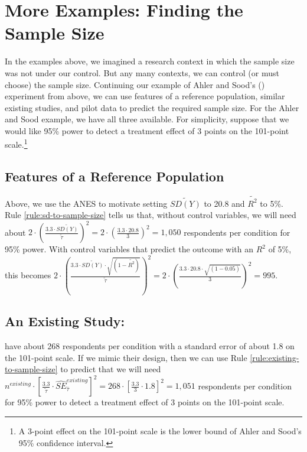 \documentclass[12pt]{article}
\begin{document}
\section*{More Examples: Finding the Sample Size}

In the examples above, we imagined a research context in which the sample size was not under our control. 
But any many contexts, we can control (or must choose) the sample size. 
Continuing our example of Ahler and Sood's (\citeyear{Ahler2018}) experiment from above, we can use features of a reference population, similar existing studies, and pilot data to predict the required sample size. 
For the Ahler and Sood example, we have all three available. 
For simplicity, suppose that we would like 95\% power to detect a treatment effect of 3 points on the 101-point scale.\footnote{A 3-point effect on the 101-point scale is the lower bound of Ahler and Sood's 95\% confidence interval.}

\subsection*{Features of a Reference Population}

Above, we use the ANES to motivate setting $\widetilde{SD(Y)}$ to 20.8 and $\widetilde{R^{2}}$ to 5\%. 
Rule \ref{rule:sd-to-sample-size} tells us that, without control variables, we will need about $2 \cdot \left( \frac{3.3 \cdot \widetilde{SD(Y)}}{\widetilde{\tau}} \right)^{2} = 2 \cdot \left( \frac{3.3 \cdot 20.8}{3} \right)^{2} = 1,050$ respondents per condition for 95\% power. 
With control variables that predict the outcome with an $R^2$ of 5\%, this becomes ${2 \cdot \left( \frac{3.3 \cdot \widetilde{SD(Y)} \cdot \sqrt{\left( 1 - \widetilde{R^{2}} \right)}}{\widetilde{\tau}} \right)}^{2} = 2 \cdot \left( \frac{3.3 \cdot 20.8 \cdot \sqrt{(1 - 0.05)}}{3} \right)^{2} = 995$.

\subsection*{An Existing Study: \cite{Ahler2018}}

\cite{Ahler2018} have about 268 respondents per condition with a
standard error of about 1.8 on the 101-point scale. 
If we mimic their design, then we can use Rule \ref{rule:existing-to-sample-size} to predict that we will need $n^{existing} \cdot \left\lbrack \frac{3.3}{\widetilde{\tau}} \cdot {\widehat{SE}}_{\widehat{\tau}}^{existing} \right\rbrack^{2} = 268 \cdot \left\lbrack \frac{3.3}{3} \cdot 1.8 \right\rbrack^{2} = 1,051$ respondents per condition for 95\% power to detect a treatment effect of 3 points on the 101-point scale.
\end{document}
